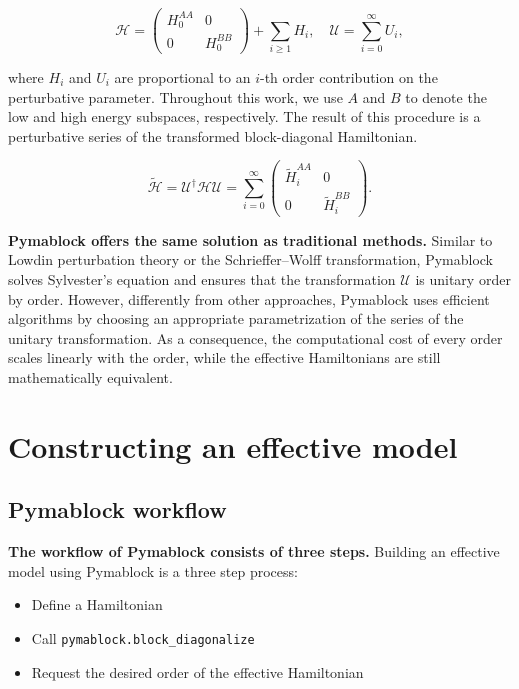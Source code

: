 \documentclass[submission, Codebases]{SciPost}
\begin{document}
{{\begin{equation}
\mathcal{H} = \begin{pmatrix}H_0^{AA} & 0 \\ 0 & H_0^{BB}\end{pmatrix} + \sum_{i\geq 1} H_i,\quad
\mathcal{U} = \sum_{i=0}^\infty U_i,
\end{equation}

where $H_i$ and $U_i$ are proportional to an $i$-th order
contribution on the perturbative parameter.
Throughout this work, we use $A$ and $B$ to denote the low and high energy
subspaces, respectively.
The result of this procedure is a perturbative series of the transformed
block-diagonal Hamiltonian.

\begin{equation}
\label{eq:transformed_hamiltonian}
\tilde{\mathcal{H}} = \mathcal{U}^\dagger \mathcal{H} \mathcal{U}=\sum_{i=0}^{\infty}
\begin{pmatrix}
\tilde{H}_i^{AA} & 0 \\
0 & \tilde{H}_i^{BB}
\end{pmatrix}.
\end{equation}

\textbf{Pymablock offers the same solution as traditional methods.}
Similar to Lowdin perturbation theory or the Schrieffer--Wolff transformation,
Pymablock solves Sylvester's equation and ensures that the transformation
$\mathcal{U}$ is unitary order by order.
However, differently from other approaches, Pymablock uses efficient algorithms
by choosing an appropriate parametrization of the series of the unitary
transformation.
As a consequence, the computational cost of every order scales linearly with
the order, while the effective Hamiltonians are still mathematically equivalent.

\section{Constructing an effective model}

\subsection{Pymablock workflow}

\textbf{The workflow of Pymablock consists of three steps.}
Building an effective model using Pymablock is a three step process:

\begin{itemize}
\item Define a Hamiltonian
\item Call \texttt{pymablock.block\_diagonalize}
\item Request the desired order of the effective Hamiltonian
\end{itemize}

}}
\end{document}
